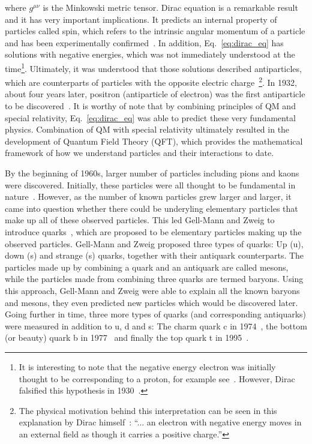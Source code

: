 where $g^{\mu\nu}$ is the Minkowski metric tensor.
Dirac equation is a remarkable result and it has very important implications.
It predicts an internal property of particles called spin, 
which refers to the intrinsic angular momentum of a particle and has been
experimentally confirmed~\cite{Dirac:1928hu}. In addition, Eq.~\ref{eq:dirac_eq} has solutions with negative
energies, which was not immediately understood at the time\footnote{It is interesting to note
that the negative energy electron was initially thought to be corresponding to a proton,
for example see~\cite{Weyl:1929fm}. However, Dirac falsified this hypothesis
in 1930~\cite{Dirac:1930ek}.}. 
Ultimately, it was understood that those solutions described
antiparticles, which are counterparts of particles with the opposite electric 
charge~\footnote{The physical motivation behind this interpretation can be seen 
in this explanation by Dirac himself~\cite{Dirac:1930ek}: 
``... an electron with negative energy moves in an external
field as though it carries a positive charge.''}. 
In 1932, about four years later, positron (antiparticle of electron) 
was the first antiparticle to be discovered~\cite{Anderson:1932zz}. 
It is worthy of note that by combining principles of QM and special relativity,
Eq.~\ref{eq:dirac_eq} was able to predict these very fundamental physics.
Combination of QM with special relativity ultimately resulted in the development of 
Quantum Field Theory (QFT), which provides the mathematical framework 
of how we understand particles and their interactions to date.

By the beginning of 1960s, larger number of particles including
pions and kaons were discovered. Initially, these particles were all thought to 
be fundamental in nature~\cite{Riordan:1992hr}. 
However, as the number of known particles grew larger and larger, it came into 
question whether there could be
underyling elementary particles that make up all of these observed particles. This led 
Gell-Mann and Zweig to introduce quarks~\cite{Gell-Mann:1964ewy}, which are proposed to
be elementary particles making up the observed particles. Gell-Mann and Zweig proposed 
three types of quarks:
Up (u), down (s) and strange (s) quarks, together with their antiquark counterparts.
The particles made up by combining a quark and an antiquark are called mesons, while the particles made
from combining three quarks are termed baryons. Using this approach, Gell-Mann and Zweig were able to
explain all the known baryons and mesons, they even predicted new particles which would be discovered 
later\cite{Riordan:1992hr}. Going further in time, three more types of quarks (and corresponding 
antiquarks) were measured in addition to u, d and s: The charm quark c in 1974~\cite{E598:1974sol}, the
bottom (or beauty) quark b in 1977~\cite{E288:1977xhf} and finally the top quark t in 1995~\cite{D0:1995jca}.

